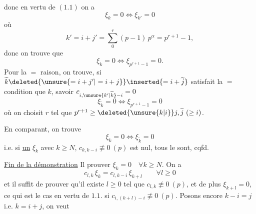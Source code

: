 donc en vertu de $(1.1)$ on a
\[
 \xi_k=0\Longleftrightarrow\xi_{k'}=0
\]
où
\[
 k'=i+j'=\sum_0^r(p-1)\,p^\alpha=p^{r+1}-1,
\]
donc on trouve que
\[
 \xi_k=0\Longleftrightarrow\xi_{p^{r+1}-1}=0.
\]
Pour la $=$ raison, on trouve, si $\widetilde k\deleted{\unsure{=i+j'|=i+j}}\inserted{=i+\widetilde j}$ satisfait la $=$ condition que $k$, savoir $c_{i,\unsure{k'|\widetilde k}-i}=0$
\[
 \xi_{\widetilde k}=0\Longleftrightarrow\xi_{p^{r+1}-1}=0
\]
où on choisit $r$ tel que $p^{r+1}\geq\deleted{\unsure{k|i}}j,\widetilde j\ (\geq i)$.

En comparant, on trouve
\[
 \xi_k=0\Longleftrightarrow\xi_{\widetilde k}=0
\]
i.e. si \uline{un} $\xi_k$ avec $k\geq N$, $c_{k,k-i}\not\equiv0\ (p)$ est nul, tous le sont, cqfd.

\uline{Fin de la démonstration} Il  prouver $\xi_k=0\quad\forall k\geq N$. On a
\[
 c_{l,k}\,\xi_k=c_{l,k-i}\,\xi_{k+l}\qquad\forall l\geq0
\]
et il suffit de prouver qu'il existe $l\geq0$ tel que $c_{l,k}\not\equiv0\ (p)$, et de plus $\xi_{k+l}=0$, ce qui est le cas  en vertu de $1.1.$ si $c_{i,(k+l)-i}\not\equiv0\ (p)$. Posons encore $k-i=j$ i.e. $k=i+j$, on veut

